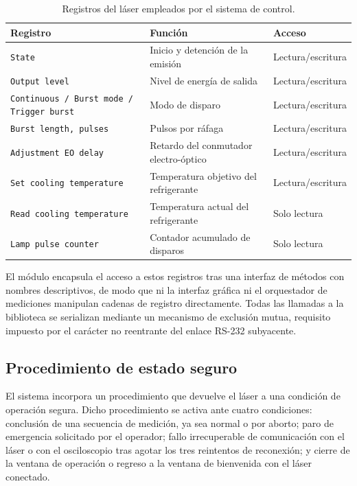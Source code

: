 \begin{table}[H]
  \centering
  \caption{Registros del láser empleados por el sistema de control.}
  \label{tab:registros_laser}
  \begin{tabularx}{\textwidth}{lXl}
    \toprule
    \textbf{Registro} & \textbf{Función} & \textbf{Acceso} \\
    \midrule
    \texttt{State} & Inicio y detención de la emisión & Lectura/escritura \\
    \texttt{Output level} & Nivel de energía de salida & Lectura/escritura \\
    \texttt{Continuous / Burst mode / Trigger burst}
      & Modo de disparo & Lectura/escritura \\
    \texttt{Burst length, pulses} & Pulsos por ráfaga & Lectura/escritura \\
    \texttt{Adjustment EO delay} & Retardo del conmutador electro-óptico
      & Lectura/escritura \\
    \texttt{Set cooling temperature}& Temperatura objetivo del refrigerante
      & Lectura/escritura \\
    \texttt{Read cooling temperature}
      & Temperatura actual del refrigerante
      & Solo lectura \\
    \texttt{Lamp pulse counter} & Contador acumulado de disparos & Solo lectura \\
    \bottomrule
  \end{tabularx}
\end{table}

El módulo encapsula el acceso a estos registros tras una interfaz de
métodos con nombres descriptivos, de modo que ni la interfaz gráfica
ni el orquestador de mediciones manipulan cadenas de registro
directamente. Todas las llamadas a la biblioteca se serializan
mediante un mecanismo de exclusión mutua, requisito impuesto por el
carácter no reentrante del enlace RS-232 subyacente.

\subsection*{Procedimiento de estado seguro}

El sistema incorpora un procedimiento que devuelve el láser a una
condición de operación segura. Dicho procedimiento se activa ante
cuatro condiciones: conclusión de una secuencia de medición, ya sea
normal o por aborto; paro de emergencia solicitado por el operador;
fallo irrecuperable de comunicación con el láser o con el osciloscopio
tras agotar los tres reintentos de reconexión; y cierre de la ventana
de operación o regreso a la ventana de bienvenida con el láser
conectado.

